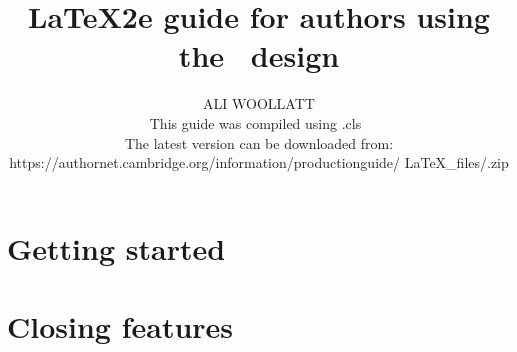 \begin{smallverbatim}
  \theoremstyle{definition}
  \newtheorem{definition}[theorem]{Definition}
  \newtheorem{condition}[theorem]{Condition}

  \theoremstyle{remark}
  \newtheorem{remark}{Remark}[chapter]
  \newtheorem{notation}[remark]{Notation}
  \newtheorem*{case}{Case}


  \setcounter{tocdepth}{2}%


% 


  
  \title[Subtitle, if you have one]
    {LaTeX2e guide for authors using the \cambridge\ design}

  \author{ALI WOOLLATT\\[3\baselineskip]
    This guide was compiled using \hbox{\cambridge.cls \version}\\[\baselineskip]
    The latest version can be downloaded from:
    https://authornet.cambridge.org/information/productionguide/
      LaTeX\_files/\cambridge.zip}

  \frontmatter
  \maketitle
  \tableofcontents
  \listoffigures
  \listoftables
  \listoffloatingboxes
  \listofcontributors
  

  \mainmatter
  \part{Getting started}

  \part{Closing features}

  \backmatter
  \appendix
  
  
  
  \endappendix


\end{smallverbatim}
